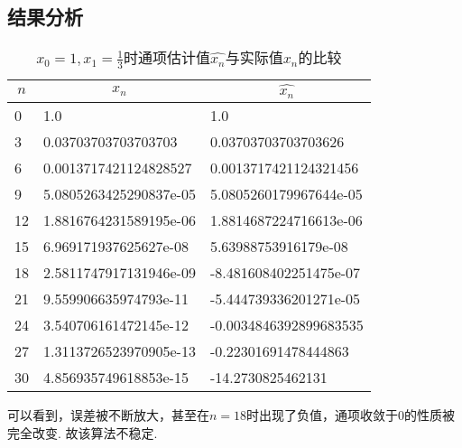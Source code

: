 \documentclass[UTF8,ctexart,a4paper,11pt,openany]{article}
\theoremstyle{definition}
\begin{document}
    \subsection{结果分析}
    \begin{table}[H]
        \centering
        \begin{tabular}{lll}
            \toprule
            \multicolumn{1}{c}{$n$} & \multicolumn{1}{c}{$x_n$} & \multicolumn{1}{c}{$\hat{x_n}$} \\ \midrule
            0                     & 1.0                     & 1.0                     \\
            3                     & 0.03703703703703703     & 0.03703703703703626     \\
            6                     & 0.0013717421124828527   & 0.0013717421124321456   \\
            9                     & 5.0805263425290837e-05  & 5.0805260179967644e-05  \\
            12                    & 1.8816764231589195e-06  & 1.8814687224716613e-06  \\
            15                    & 6.969171937625627e-08   & 5.63988753916179e-08    \\
            18                    & 2.5811747917131946e-09  & -8.481608402251475e-07  \\
            21                    & 9.559906635974793e-11   & -5.444739336201271e-05  \\
            24                    & 3.540706161472145e-12   & -0.0034846392899683535  \\
            27                    & 1.3113726523970905e-13  & -0.22301691478444863    \\
            30                    & 4.856935749618853e-15   & -14.2730825462131       \\ \bottomrule
        \end{tabular}
        \caption{$x_0=1,x_1=\frac{1}{3}$时通项估计值$\hat{x_n}$与实际值$x_n$的比较}
        \label{tab:my-table}
    \end{table}
    可以看到，误差被不断放大，甚至在$n=18$时出现了负值，通项收敛于$0$的性质被完全改变. 故该算法不稳定. \par
\end{document}
